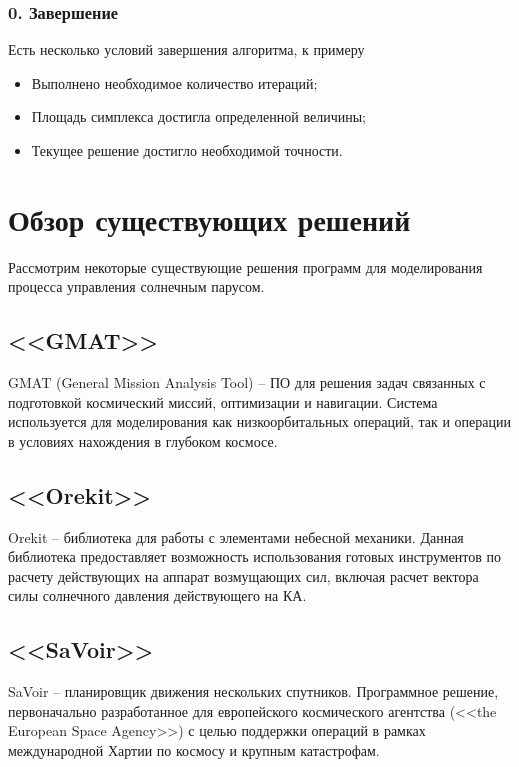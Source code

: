 \subsubsection{0. Завершение}
\noindent\indent Есть несколько условий завершения алгоритма, к примеру\par
\begin{itemize}
  \item Выполнено необходимое количество итераций;
  \item Площадь симплекса достигла определенной величины;
  \item Текущее решение достигло необходимой точности.
\end{itemize}
\section{Обзор существующих решений}
\noindent\indent Рассмотрим некоторые существующие решения программ для моделирования
процесса управления солнечным парусом.
\subsection{<<GMAT>>}
\noindent\indent GMAT (General Mission Analysis Tool) -- ПО для решения задач связанных
с подготовкой космический миссий, оптимизации и навигации. Система используется для
моделирования как низкоорбитальных операций, так и операции в условиях нахождения
в глубоком космосе.
\subsection{<<Orekit>>}
\noindent\indent Orekit -- библиотека для работы с элементами небесной механики.
Данная библиотека предоставляет возможность использования готовых инструментов по расчету
действующих на аппарат возмущающих сил, включая расчет вектора силы солнечного давления
действующего на КА.
\subsection{<<SaVoir>>}
\noindent\indent SaVoir -- планировщик движения нескольких спутников. Программное
решение, первоначально разработанное для европейского космического агентства
(<<the European Space Agency>>) с целью поддержки операций в рамках международной
Хартии по космосу и крупным катастрофам.
